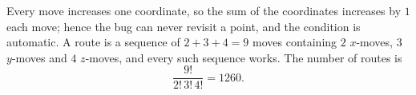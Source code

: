 Every move increases one coordinate, so the sum of the coordinates increases by $1$ each move; hence the bug can never revisit a point, and the condition is automatic. A route is a sequence of $2+3+4=9$ moves containing $2$ $x$-moves, $3$ $y$-moves and $4$ $z$-moves, and every such sequence works. The number of routes is
\[
\dfrac{9!}{2!\,3!\,4!}=\boxed{1260}.
\]
